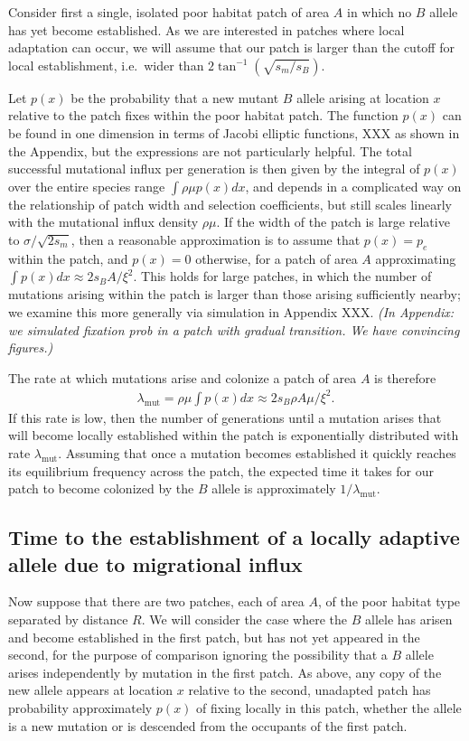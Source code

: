 \documentclass{article}
\newcommand{\mutrate}{\lambda_\text{mut}}
\newcommand{\plr}[1]{{\it\color{blue}(#1)}}
\begin{document}
Consider first a single, isolated poor habitat patch of area $A$ in which no $B$ allele has yet become established. 
As we are interested in patches where local adaptation can occur,
we will assume that our patch is larger than the cutoff for local establishment, 
i.e.\ wider than $2 \tan^{-1} (\sqrt{s_m/s_B})$.

Let $p(x)$ be the probability that a new mutant $B$ allele arising at location $x$ 
relative to the patch fixes within the poor habitat patch.
The function $p(x)$ can be found in one dimension in terms of Jacobi elliptic functions,
XXX as shown in the Appendix, but the expressions are not particularly helpful.
The total successful mutational influx per generation is then given by the integral of $p(x)$ over the entire species range $\int \rho \mu p(x) dx$,
and depends in a complicated way on the relationship of patch width and selection coefficients,
but still scales linearly with the mutational influx density $\rho \mu$.
If the width of the patch is large relative to $\sigma/\sqrt{2s_m}$, 
then a reasonable approximation is to assume that $p(x) = p_e$ within the patch, and $p(x) = 0$ otherwise,
for a patch of area $A$ approximating $\int p(x) dx \approx 2 s_B A / \xi^2$. 
This holds for large patches, in which the number of mutations arising within the patch is larger 
than those arising sufficiently nearby;
we examine this more generally via simulation in Appendix XXX.
\plr{In Appendix: we simulated fixation prob in a patch with gradual transition.  We have convincing figures.}

The rate at which mutations arise and colonize a patch of area $A$ is therefore
\begin{align} \label{eqn:mutrate}
  \mutrate = \rho \mu \int p(x) dx  \approx 2 s_B \rho A \mu / \xi^2.
\end{align}
If this rate is low,  then the number of generations until a mutation arises that
will become locally established within the patch is exponentially distributed with rate $\mutrate$.  
Assuming that once a mutation becomes established it quickly reaches its equilibrium frequency across the patch, 
the expected time it takes for our patch to become colonized by the $B$ allele is approximately $1/\mutrate$.


\subsection{Time to the establishment of a locally adaptive allele due to migrational influx}
\label{ss:patchymigration}
Now suppose that there are two patches, each of area $A$, of the poor
habitat type separated by distance $R$. 
We will consider the case where the $B$ allele has arisen and become established in the first patch, but has not yet appeared in the second,
for the purpose of comparison ignoring the possibility that a $B$ allele arises independently by mutation in the first patch.
As above, any copy of the new allele appears at location $x$ relative to the second, unadapted patch 
has probability approximately $p(x)$ of fixing locally in this patch,
whether the allele is a new mutation or is descended from the occupants of the first patch.
\end{document}
